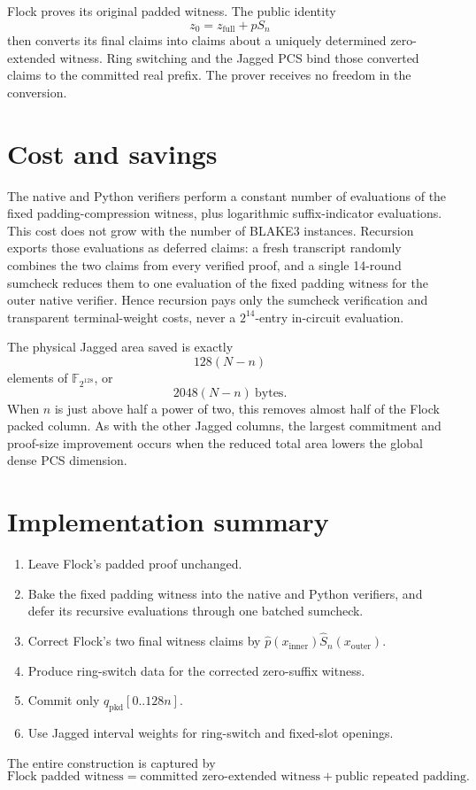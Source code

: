 \documentclass[11pt]{article}
\newcommand{\F}{\mathbb{F}_{2^{128}}}
\begin{document}
Flock proves its original padded witness.  The public identity
\[
    z_0=z_{\mathrm{full}}+pS_n
\]
then converts its final claims into claims about a uniquely determined
zero-extended witness.  Ring switching and the Jagged PCS bind those converted
claims to the committed real prefix.  The prover receives no freedom in the
conversion.

\section{Cost and savings}

The native and Python verifiers perform a constant number of evaluations of
the fixed padding-compression witness, plus logarithmic suffix-indicator
evaluations.  This cost does not grow with the number of BLAKE3 instances.
Recursion exports those evaluations as deferred claims: a fresh transcript
randomly combines the two claims from every verified proof, and a single
14-round sumcheck reduces them to one evaluation of the fixed padding witness
for the outer native verifier.  Hence recursion pays only the sumcheck
verification and transparent terminal-weight costs, never a $2^{14}$-entry
in-circuit evaluation.

The physical Jagged area saved is exactly
\[
    128(N-n)
\]
elements of \(\F\), or
\[
    2048(N-n)\ \text{bytes}.
\]
When \(n\) is just above half a power of two, this removes almost half of the
Flock packed column.  As with the other Jagged columns, the largest commitment
and proof-size improvement occurs when the reduced total area lowers the
global dense PCS dimension.

\section{Implementation summary}

\begin{enumerate}
  \item Leave Flock's padded proof unchanged.
  \item Bake the fixed padding witness into the native and Python verifiers,
        and defer its recursive evaluations through one batched sumcheck.
  \item Correct Flock's two final witness claims by
        \(\widehat p(x_{\mathrm{inner}})
          \widehat S_n(x_{\mathrm{outer}})\).
  \item Produce ring-switch data for the corrected zero-suffix witness.
  \item Commit only \(q_{\mathrm{pkd}}[0..128n]\).
  \item Use Jagged interval weights for ring-switch and fixed-slot openings.
\end{enumerate}

The entire construction is captured by
\[
 \boxed{
   \text{Flock padded witness}
   =
   \text{committed zero-extended witness}
   +
   \text{public repeated padding}.
 }
\]
\end{document}
